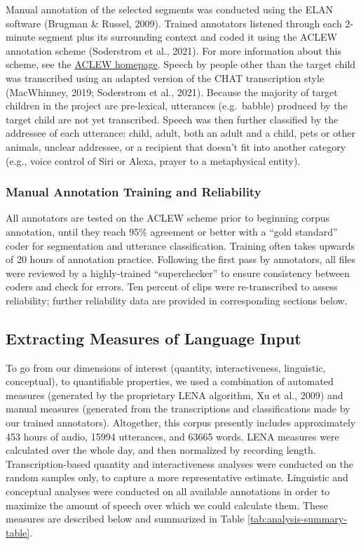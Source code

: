 \documentclass[
  man,floatsintext]{apa6}
\begin{document}
Manual annotation of the selected segments was conducted using the ELAN software (Brugman \& Russel, 2009). Trained annotators listened through each 2-minute segment plus its surrounding context and coded it using the ACLEW annotation scheme (Soderstrom et al., 2021). For more information about this scheme, see the \href{https://sites.google.com/view/aclewdid/home}{ACLEW homepage}. Speech by people other than the target child was transcribed using an adapted version of the CHAT transcription style (MacWhinney, 2019; Soderstrom et al., 2021). Because the majority of target children in the project are pre-lexical, utterances (e.g.~babble) produced by the target child are not yet transcribed. Speech was then further classified by the addressee of each utterance: child, adult, both an adult and a child, pets or other animals, unclear addressee, or a recipient that doesn't fit into another category (e.g., voice control of Siri or Alexa, prayer to a metaphysical entity).

\hypertarget{manual-annotation-training-and-reliability}{%
\subsubsection{Manual Annotation Training and Reliability}\label{manual-annotation-training-and-reliability}}

All annotators are tested on the ACLEW scheme prior to beginning corpus annotation, until they reach 95\% agreement or better with a ``gold standard'' coder for segmentation and utterance classification. Training often takes upwards of 20 hours of annotation practice. Following the first pass by annotators, all files were reviewed by a highly-trained ``superchecker'' to ensure consistency between coders and check for errors. Ten percent of clips were re-transcribed to assess reliability; further reliability data are provided in corresponding sections below.

\hypertarget{extracting-measures-of-language-input}{%
\subsection{Extracting Measures of Language Input}\label{extracting-measures-of-language-input}}

To go from our dimensions of interest (quantity, interactiveness, linguistic, conceptual), to quantifiable properties, we used a combination of automated measures (generated by the proprietary LENA algorithm, Xu et al., 2009) and manual measures (generated from the transcriptions and classifications made by our trained annotators). Altogether, this corpus presently includes approximately 453 hours of audio, 15994 utterances, and 63665 words. LENA measures were calculated over the whole day, and then normalized by recording length. Transcription-based quantity and interactiveness analyses were conducted on the random samples only, to capture a more representative estimate. Linguistic and conceptual analyses were conducted on all available annotations in order to maximize the amount of speech over which we could calculate them. These measures are described below and summarized in Table \ref{tab:analysis-summary-table}.
\end{document}
